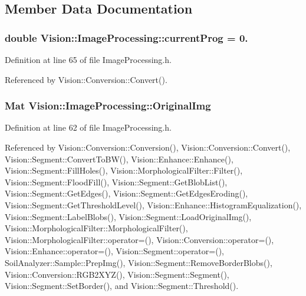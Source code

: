 \subsection{Member Data Documentation}
\hypertarget{class_vision_1_1_image_processing_ac06b3b9501cde8e742aaf99d986af256}{}
\subsubsection[{current\+Prog}]{\setlength{\rightskip}{0pt plus 5cm}double Vision\+::\+Image\+Processing\+::current\+Prog = 0.}\label{class_vision_1_1_image_processing_ac06b3b9501cde8e742aaf99d986af256}


Definition at line 65 of file Image\+Processing.\+h.



Referenced by Vision\+::\+Conversion\+::\+Convert().

\hypertarget{class_vision_1_1_image_processing_a77c370dab270158a4e9c634e2d3f48e7}{}
\subsubsection[{Original\+Img}]{\setlength{\rightskip}{0pt plus 5cm}Mat Vision\+::\+Image\+Processing\+::\+Original\+Img}\label{class_vision_1_1_image_processing_a77c370dab270158a4e9c634e2d3f48e7}


Definition at line 62 of file Image\+Processing.\+h.



Referenced by Vision\+::\+Conversion\+::\+Conversion(), Vision\+::\+Conversion\+::\+Convert(), Vision\+::\+Segment\+::\+Convert\+To\+B\+W(), Vision\+::\+Enhance\+::\+Enhance(), Vision\+::\+Segment\+::\+Fill\+Holes(), Vision\+::\+Morphological\+Filter\+::\+Filter(), Vision\+::\+Segment\+::\+Flood\+Fill(), Vision\+::\+Segment\+::\+Get\+Blob\+List(), Vision\+::\+Segment\+::\+Get\+Edges(), Vision\+::\+Segment\+::\+Get\+Edges\+Eroding(), Vision\+::\+Segment\+::\+Get\+Threshold\+Level(), Vision\+::\+Enhance\+::\+Histogram\+Equalization(), Vision\+::\+Segment\+::\+Label\+Blobs(), Vision\+::\+Segment\+::\+Load\+Original\+Img(), Vision\+::\+Morphological\+Filter\+::\+Morphological\+Filter(), Vision\+::\+Morphological\+Filter\+::operator=(), Vision\+::\+Conversion\+::operator=(), Vision\+::\+Enhance\+::operator=(), Vision\+::\+Segment\+::operator=(), Soil\+Analyzer\+::\+Sample\+::\+Prep\+Img(), Vision\+::\+Segment\+::\+Remove\+Border\+Blobs(), Vision\+::\+Conversion\+::\+R\+G\+B2\+X\+Y\+Z(), Vision\+::\+Segment\+::\+Segment(), Vision\+::\+Segment\+::\+Set\+Border(), and Vision\+::\+Segment\+::\+Threshold().


